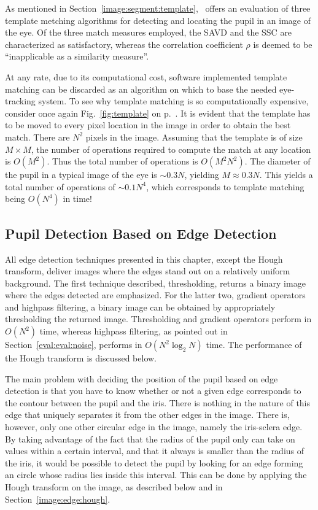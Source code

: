 As mentioned in Section~\ref{image:segment:template},~\cite{template}
offers an evaluation of three template metching algorithms for
detecting and locating the pupil in an image of the eye.  Of the three
match measures employed, the SAVD and the SSC are characterized as
satisfactory, whereas the correlation coefficient $\rho$ is deemed to
be ``inapplicable as a similarity measure''.

At any rate, due to its computational cost, software implemented
template matching can be discarded as an algorithm on which to base
the needed eye-tracking system.  To see why template matching is so
computationally expensive, consider once again Fig.~\ref{fig:template}
on p.~\pageref{fig:template}.  It is evident that the template has to
be moved to every pixel location in the image in order to obtain the
best match.  There are $N^{2}$ pixels in the image.  Assuming that the
template is of size $M\times M$, the number of operations required to
compute the match at any location is $O(M^{2})$.  Thus the total
number of operations is $O(M^{2}N^{2})$.  The diameter of the pupil in
a typical image of the eye is $\sim 0.3N$, yielding $M\approx 0.3N$.
This yields a total number of operations of $\sim 0.1N^{4}$, which
corresponds to template matching being $O(N^{4})$ in time!

\subsection{Pupil Detection Based on Edge Detection}
\label{eval:eval:edge}

All edge detection techniques presented in this chapter, except the
Hough transform, deliver images where the edges stand out on a
relatively uniform background.  The first technique described,
thresholding, returns a binary image where the edges detected are
emphasized.  For the latter two, gradient operators and highpass
filtering, a binary image can be obtained by appropriately
thresholding the returned image.  Thresholding and gradient operators
perform in $O(N^{2})$ time, whereas highpass filtering, as pointed out
in Section~\ref{eval:eval:noise}, performs in $O(N^{2}\log_{2}N)$
time.  The performance of the Hough transform is discussed below.

The main problem with deciding the position of the pupil based on edge
detection is that you have to know whether or not a given edge
corresponds to the contour between the pupil and the iris.  There is
nothing in the nature of this edge that uniquely separates it from the
other edges in the image.  There is, however, only one other circular
edge in the image, namely the iris-sclera edge.  By taking advantage
of the fact that the radius of the pupil only can take on values
within a certain interval, and that it always is smaller than the
radius of the iris, it would be possible to detect the pupil by
looking for an edge forming an circle whose radius lies inside this
interval.  This can be done by applying the Hough transform on the
image, as described below and in Section~\ref{image:edge:hough}.

